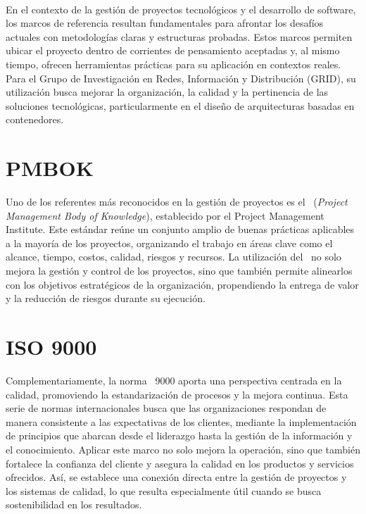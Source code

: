 \label{cap:marcoTeorico}
\mbox{}\\
En el contexto de la gestión de proyectos tecnológicos y el desarrollo de software, los marcos de referencia resultan fundamentales para afrontar los desafíos actuales con metodologías claras y estructuras probadas. Estos marcos permiten ubicar el proyecto dentro de corrientes de pensamiento aceptadas y, al mismo tiempo, ofrecen herramientas prácticas para su aplicación en contextos reales. Para el Grupo de Investigación en Redes, Información y Distribución (GRID), su utilización busca mejorar la organización, la calidad y la pertinencia de las soluciones tecnológicas, particularmente en el diseño de arquitecturas basadas en contenedores.

\section{PMBOK}
Uno de los referentes más reconocidos en la gestión de proyectos es el \PMBOK\ (\textit{Project Management Body of Knowledge}), establecido por el Project Management Institute. Este estándar reúne un conjunto amplio de buenas prácticas aplicables a la mayoría de los proyectos, organizando el trabajo en áreas clave como el alcance, tiempo, costos, calidad, riesgos y recursos\citep{project2017guia}. La utilización del \PMBOK\ no solo mejora la gestión y control de los proyectos, sino que también permite alinearlos con los objetivos estratégicos de la organización, propendiendo la entrega de valor y la reducción de riesgos durante su ejecución\citep{Monday2022}.

\section{ISO 9000}
Complementariamente, la norma \ISO\ 9000 aporta una perspectiva centrada en la calidad, promoviendo la estandarización de procesos y la mejora continua\citep{ISO9001}. Esta serie de normas internacionales busca que las organizaciones respondan de manera consistente a las expectativas de los clientes, mediante la implementación de principios que abarcan desde el liderazgo hasta la gestión de la información y el conocimiento. Aplicar este marco no solo mejora la operación, sino que también fortalece la confianza del cliente y asegura la calidad en los productos y servicios ofrecidos\citep{Gray2022}. Así, se establece una conexión directa entre la gestión de proyectos y los sistemas de calidad, lo que resulta especialmente útil cuando se busca sostenibilidad en los resultados.

